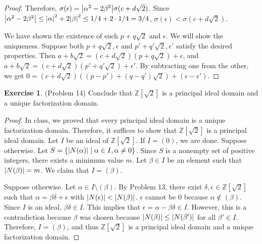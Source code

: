 \documentclass[12pt, psamsfonts]{amsart}
\theoremstyle{definition}
\newtheorem*{exer}{Exercise}
\theoremstyle{remark}
\numberwithin{equation}{section}
\begin{document}
\begin{proof}
  Therefore, $\sigma(\epsilon) = \abs{\alpha^2 - 2\beta^2}\sigma(c + d\sqrt{2})$.
  Since $\abs{\alpha^2 - 2\beta^2} \leq \abs{\alpha}^2 + 2\abs{\beta}^2 \leq 1/4 + 2 \cdot 1/4 = 3/4$, $\sigma(\epsilon) < \sigma(c + d\sqrt{2})$.

  We have shown the existence of such $p + q\sqrt{2}$ and $\epsilon$.
  We will show the uniqueness.
  Suppose both $p + q\sqrt{2}, \epsilon$ and $p' + q'\sqrt{2}, \epsilon'$ satisfy the desired properties.
  Then $a + b\sqrt{2} = (c + d\sqrt{2})(p + q\sqrt{2}) + \epsilon$, and $a + b\sqrt{2} = (c + d\sqrt{2})(p' + q'\sqrt{2}) + \epsilon'$.
  By subtracting one from the other, we get $0 = (c + d\sqrt{2})((p - p') + (q - q')\sqrt{2}) + (\epsilon - \epsilon')$.


\end{proof}

\begin{exer}{(Problem 14)}
  Conclude that $\mathbb{Z}[\sqrt{2}]$ is a principal ideal domain and a unique factorization domain.
\end{exer}

\begin{proof}
  In class, we proved that every principal ideal domain is a unique factorization domain.
  Therefore, it suffices to show that $\mathbb{Z}[\sqrt{2}]$ is a principal ideal domain.
  Let $I$ be an ideal of $\mathbb{Z}[\sqrt{2}]$.
  If $I = (0)$, we are done.
  Suppose otherwise.
  Let $S = \{ \abs{N(\alpha)} \mid \alpha \in I, \alpha \ne 0 \}$.
  Since $S$ is a nonempty set of positive integers, there exists a minimum value $m$.
  Let $\beta \in I$ be an element such that $\abs{N(\beta)} = m$.
  We claim that $I = (\beta)$.

  Suppose otherwise.
  Let $\alpha \in I \setminus (\beta)$.
  By Problem 13, there exist $\delta, \epsilon \in \mathbb{Z}[\sqrt{2}]$ such that $\alpha = \beta\delta + \epsilon$ with $\abs{N(\epsilon)} < \abs{N(\beta)}$.
  $\epsilon$ cannot be $0$ because $\alpha \notin (\beta)$.
  Since $I$ is an ideal, $\beta\delta \in I$.
  This implies that $\epsilon = \alpha - \beta\delta \in I$.
  However, this is a contradiction because $\beta$ was chosen because $\abs{N(\beta)} \leq \abs{N(\beta')}$ for all $\beta' \in I$.
  Therefore, $I = (\beta)$, and thus $\mathbb{Z}[\sqrt{2}]$ is a principal ideal domain and a unique factorization domain.
\end{proof}
\end{document}
